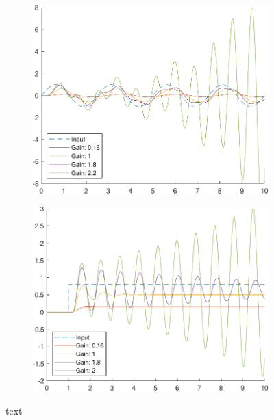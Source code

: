 \begin{figure}
	\begin{subfigure}{0.5\linewidth}
		\centering
		\includegraphics[width=0.9\linewidth]{../code/pupillary/sine/figs/gainPlot}
		\caption{}
	\end{subfigure}\hfill
	\begin{subfigure}{0.5\linewidth}
		\centering
		\includegraphics[width=0.9\linewidth]{../code/pupillary/step/figs/gainPlot}
		\caption{}
	\end{subfigure}\hfill
	\caption{text}
\end{figure}

